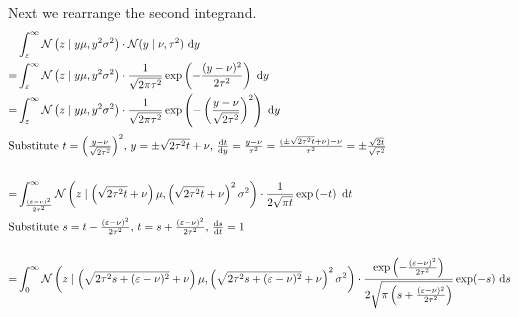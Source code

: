 \documentclass[11pt,a4paper]{book}
\begin{document}
Next we rearrange the second integrand.
\begin{align*}
  & \int_{\varepsilon}^{\infty} \mathcal{N}\left( z \mid y\mu, y^{2}\sigma^{2} \right) \cdot \mathcal{N}(y \mid \nu, \tau^{2})~\mathrm{d}y\\
  =& \int_{\varepsilon}^{\infty} \mathcal{N}\left( z \mid y\mu, y^{2}\sigma^{2} \right) \cdot \frac{1}{\sqrt{2 \pi \tau^{2}}} \exp\left( -\frac{(y - \nu)^{2}}{2\tau^{2}} \right)~\mathrm{d}y\\
  =& \int_{\varepsilon}^{\infty} \mathcal{N}\left( z \mid y\mu, y^{2}\sigma^{2} \right) \cdot \frac{1}{\sqrt{2 \pi \tau^{2}}} \exp\left( -\left( \frac{y - \nu}{\sqrt{2\tau^{2}}} \right)^{2} \right)~\mathrm{d}y\\
  \intertext{Substitute $t = \left( \frac{y - \nu}{\sqrt{2\tau^{2}}} \right)^{2}$, $y = \pm \sqrt{2\tau^{2} t} + \nu$, $\frac{\mathrm{d}t}{\mathrm{d}y} = \frac{y - \nu}{\tau^{2}} = \frac{(\pm \sqrt{2\tau^{2} t} + \nu) - \nu}{\tau^{2}} = \pm \frac{\sqrt{2t}}{\sqrt{\tau^{2}}}$}\\
  =& \int_{\frac{(\varepsilon - \nu)^{2}}{2\tau^{2}}}^{\infty} \mathcal{N}\left( z \mid \left( \sqrt{2\tau^{2} t} + \nu \right)\mu, \left( \sqrt{2\tau^{2} t} + \nu \right)^{2}\sigma^{2} \right) \cdot \frac{1}{2\sqrt{\pi t}} \exp\left( -t \right)~\mathrm{d}t\\
  \intertext{Substitute $s = t - \frac{(\varepsilon - \nu)^{2}}{2\tau^{2}}$, $t = s + \frac{(\varepsilon - \nu)^{2}}{2\tau^{2}}$, $\frac{\mathrm{d}s}{\mathrm{d}t} = 1$}\\
  =& \int_{0}^{\infty} \mathcal{N}\left( z \mid \left( \sqrt{2\tau^{2} s + (\varepsilon - \nu)^{2}} + \nu \right)\mu, \left( \sqrt{2\tau^{2} s + (\varepsilon - \nu)^{2}} + \nu \right)^{2}\sigma^{2} \right) \cdot \frac{\exp\left( -\frac{(\varepsilon - \nu)^{2}}{2\tau^{2}} \right)}{2\sqrt{\pi \left( s + \frac{(\varepsilon - \nu)^{2}}{2\tau^{2}} \right)}} \exp(-s)~\mathrm{d}s
\end{align*}
\end{document}
